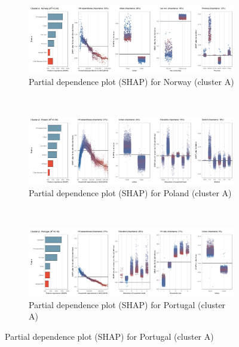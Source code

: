 \begin{figure}[ht!]\ContinuedFloat
    \centering
   \begin{subfigure}[b]{\textwidth}
   \centering
         \caption{Partial dependence plot (SHAP) for Norway (cluster A)}
         \label{fig:5b_NOR}
         \includegraphics[width=\textwidth]{Figure 5b/Figure_5b_NOR}
         \end{subfigure}
    \\
    \vspace{0.5cm}
   \begin{subfigure}[b]{\textwidth}         
         \centering
         \caption{Partial dependence plot (SHAP) for Poland (cluster A)}
         \label{fig:5b_POL}
         \includegraphics[width=\textwidth]{Figure 5b/Figure_5b_POL}
         \end{subfigure}
    \\
    \vspace{0.5cm}
   \begin{subfigure}[b]{\textwidth}
   \centering
         \caption{Partial dependence plot (SHAP) for Portugal (cluster A)}
         \label{fig:5b_PRT}
         \includegraphics[width=\textwidth]{Figure 5b/Figure_5b_PRT}

\end{subfigure}
\end{figure}
